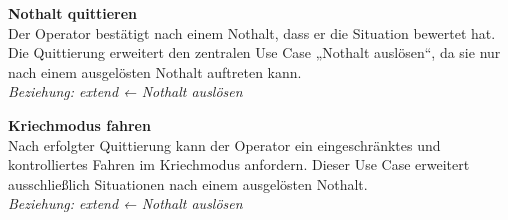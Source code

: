 \vspace{0.5em}

\textbf{Nothalt quittieren}\\
Der Operator bestätigt nach einem Nothalt, dass er die Situation bewertet hat.
Die Quittierung erweitert den zentralen Use Case „Nothalt auslösen“, da sie nur
nach einem ausgelösten Nothalt auftreten kann.\\
\textit{Beziehung: extend ← Nothalt auslösen}

\vspace{0.5em}

\textbf{Kriechmodus fahren}\\
Nach erfolgter Quittierung kann der Operator ein eingeschränktes und
kontrolliertes Fahren im Kriechmodus anfordern. Dieser Use Case erweitert
ausschließlich Situationen nach einem ausgelösten Nothalt.\\
\textit{Beziehung: extend ← Nothalt auslösen}